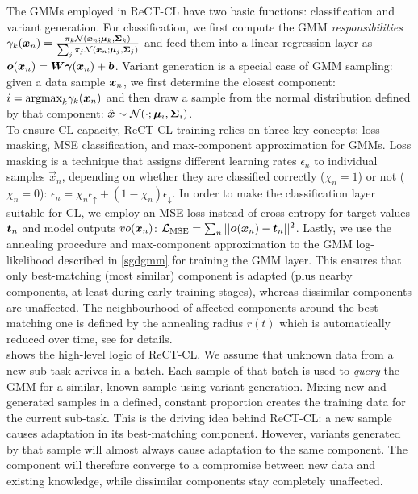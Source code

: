 \documentclass{article} %
\newcommand{\vgamma}{{\bm \gamma}}
\begin{document}
The GMMs employed in ReCT-CL have two basic functions: classification and variant generation.
For classification, 
we first compute the GMM \textit{responsibilities} $\gamma_k({\bm{x}}_n) = \frac{\pi_k\mathcal N({\bm{x}}_n; {\bm{\mu}}_k,{\bm{\Sigma}}_k)}{\sum_j \pi_j \mathcal N({\bm{x}}_n; {\bm{\mu}}_j,{\bm{\Sigma}}_j)}$ and feed them into a linear regression layer as $\vo(\vx_n) = \mW\vgamma(\vx_n) + \vb$.
Variant generation is a special case of GMM sampling: given a data sample ${\bm{x}}_n$, we first determine the closest component: $i = \text{argmax}_k \gamma_k({\bm{x}}_n)$ and then draw a sample from the normal distribution defined by that component: $\hat {{\bm{x}}} \sim \mathcal N(\cdot; {\bm{\mu}}_i, {\bm{\Sigma}}_i)$.
\\
To ensure CL capacity, ReCT-CL training relies on three key concepts: loss masking, MSE classification, and max-component approximation for GMMs. 
Loss masking is a technique that assigns different learning rates $\epsilon_n$ to individual samples $\vec x_n$, depending on whether they are classified correctly ($\chi_n = 1$) or not ($\chi_n = 0$): 
$\epsilon_n = \chi_n\epsilon_\uparrow + (1-\chi_n)\epsilon_{\downarrow}$.
In order to make the classification layer suitable for CL, we employ an MSE loss instead of cross-entropy for target values ${\bm{t}}_n$ and model outputs $vo({\bm{x}}_n)$: $\mathcal L_\text{MSE} = \sum_n ||{\bm{o}}({\bm{x}}_n)-{\bm{t}}_n||^2$. %
Lastly, we use the annealing procedure and max-component approximation to the GMM log-likelihood described in \cref{sgdgmm} for training the GMM layer. This ensures that only best-matching (most similar) component is adapted (plus nearby components, at least during early training stages), whereas dissimilar components are unaffected. The neighbourhood of affected components around the best-matching one is defined by the annealing radius $r(t)$ which is automatically reduced over time, see \cite{sgdgmm} for details.
\\
 shows the high-level logic of ReCT-CL. We assume that unknown data from a new sub-task arrives in a batch. 
Each sample of that batch is used to \textit{query} the GMM for a similar, known sample using variant generation. Mixing new and generated samples in a defined, constant proportion creates the training data for the current sub-task. 
This is the driving idea behind ReCT-CL: 
a new sample causes adaptation in its best-matching component. However, variants generated by that sample will almost always cause adaptation to the same component. The component will therefore converge to a compromise between new data and existing knowledge, while
dissimilar components stay completely unaffected. 
%
\end{document}
